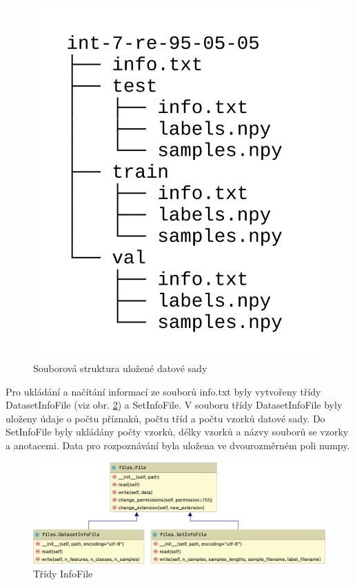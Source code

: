 \documentclass[FM,BP]{tulthesis}
\begin{document}
\begin{figure}[ht]
\centerline{\includegraphics[scale=.22]{dataset_file_structure.png}}
\caption{Souborová struktura uložené datové sady}
\label{fig:file_structure}
\end{figure}
\FloatBarrier

Pro ukládání a načítání informací ze souborů info.txt byly vytvořeny třídy DatasetInfoFile (viz obr. \mbox{\ref{fig:info_files}}) a SetInfoFile. V souboru třídy DatasetInfoFile byly uloženy údaje o počtu příznaků, počtu tříd a počtu vzorků datové sady. Do SetInfoFile byly ukládány počty vzorků, délky vzorků a názvy souborů se vzorky a anotacemi. Data pro rozpoznávání byla uložena ve dvourozměrném poli numpy.

\begin{figure}[ht]
\centerline{\includegraphics[scale=.25]{files-info.png}}
\caption{Třídy InfoFile}
\label{fig:info_files}
\end{figure}
\FloatBarrier
\end{document}
